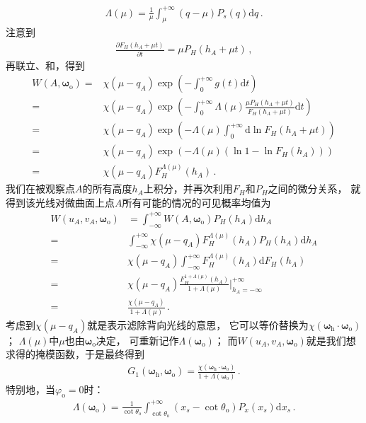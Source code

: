 \begin{align}
    \Lambda(\mu)=\frac{1}{\mu}\int_{\mu}^{+\infty}(q-\mu)P_s(q)\mathrm{d}q\, .
\end{align}
注意到
\begin{align}
    \frac{\partial F_H(h_A+\mu t)}{\partial t}=\mu P_H(h_A+\mu t)\, ,
\end{align}
再联立、和，得到
\begin{align}
    W(A,{\bm\omega}_{\mathrm{o}})=&\chi(\mu-q_A)\exp\left(-\int_{0}^{+\infty}g(t)\mathrm{d}t\right)\nonumber\\
    =&\chi(\mu-q_A)\exp\left(-\int_{0}^{+\infty}\Lambda(\mu)\frac{\mu P_H(h_A+\mu t)}{F_H(h_A+\mu t)}\mathrm{d}t\right)\nonumber\\
    =&\chi(\mu-q_A)\exp\left(-\Lambda(\mu)\int_{0}^{+\infty}\mathrm{d}\ln F_H(h_A+\mu t)\right)\nonumber\\
    =&\chi(\mu-q_A)\exp\left(-\Lambda(\mu)(\ln 1 - \ln F_H(h_A))\right)\nonumber\\
    =&\chi(\mu-q_A)F_H^{\Lambda(\mu)}(h_A)\, .
\end{align}
我们在被观察点$A$的所有高度$h_A$上积分，并再次利用$F_H$和$P_H$之间的微分关系，
就得到该光线对微曲面上点$A$所有可能的情况的可见概率均值为
\begin{align}\label{eq:08ex01-AverageVisibleProbability}
    W(u_A,v_A,{\bm\omega}_{\mathrm{o}})&=\int_{-\infty}^{+\infty}W(A,{\bm\omega}_{\mathrm{o}})P_H(h_A)\mathrm{d}h_A\nonumber\\
    =&\int_{-\infty}^{+\infty}\chi(\mu-q_A)F_H^{\Lambda(\mu)}(h_A)P_H(h_A)\mathrm{d}h_A\nonumber\\
    =&\chi(\mu-q_A)\int_{-\infty}^{+\infty}F_H^{\Lambda(\mu)}(h_A)\mathrm{d}F_H(h_A)\nonumber\\
    =&\chi(\mu-q_A)\frac{F_H^{1+\Lambda(\mu)}(h_A)}{1+\Lambda(\mu)}\bigg|_{h_A=-\infty}^{+\infty}\nonumber\\
    =&\frac{\chi(\mu-q_A)}{1+\Lambda(\mu)}\, .
\end{align}
考虑到$\chi(\mu-q_A)$就是表示滤除背向光线的意思，
它可以等价替换为$\chi({\bm\omega}_{\mathrm{h}}\cdot{\bm\omega}_{\mathrm{o}})$；
$\Lambda(\mu)$中$\mu$也由${\bm\omega}_{\mathrm{o}}$决定，
可重新记作$\Lambda({\bm\omega}_{\mathrm{o}})$；
而$W(u_A,v_A,{\bm\omega}_{\mathrm{o}})$就是我们想求得的掩模函数，于是最终得到
\begin{align}\label{eq:08-ex01-Smith-masking-function}
    G_1({\bm\omega}_{\mathrm{h}},{\bm\omega}_{\mathrm{o}})
    =\frac{\chi({\bm\omega}_{\mathrm{h}}\cdot{\bm\omega}_{\mathrm{o}})}
    {1+\Lambda({\bm\omega}_{\mathrm{o}})}\, .
\end{align}
特别地，当$\varphi_{\mathrm{o}}=0$时：
\begin{align}\label{eq:08-ex01-Lambda-function}
    \Lambda({\bm\omega}_{\mathrm{o}})=\frac{1}{\cot\theta_{\mathrm{o}}}
    \int_{\cot\theta_{\mathrm{o}}}^{+\infty}(x_s-\cot\theta_{\mathrm{o}})P_x(x_s)\mathrm{d}x_s\, .
\end{align}

